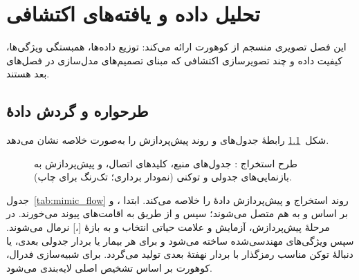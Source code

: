\chapter{تحلیل داده و یافته‌های اکتشافی}
\label{ch:data_analysis}

این فصل تصویری منسجم از کوهورت  ارائه می‌کند: توزیع داده‌ها، همبستگی ویژگی‌ها، کیفیت داده و چند تصویرسازی اکتشافی که مبنای تصمیم‌های مدل‌سازی در فصل‌های بعد هستند.

\section{طرحواره و گردش دادۀ }

شکل~\ref{fig:mimic_schema} رابطۀ جدول‌های  و روند پیش‌پردازش را به‌صورت خلاصه نشان می‌دهد.

\begin{figure}[htbp]
\centering
\begin{latin}

\end{latin}
\caption{طرح استخراج : جدول‌های منبع، کلیدهای اتصال، و پیش‌پردازش به بازنمایی‌های جدولی و توکنی (نمودار برداری؛ تک‌رنگ برای چاپ).}
\label{fig:mimic_schema}
\end{figure}

جدول~\ref{tab:mimic_flow} روند استخراج و پیش‌پردازش دادۀ  را خلاصه می‌کند. ابتدا \texttt{}، \texttt{} و \texttt{} بر اساس \texttt{} و \texttt{} به هم متصل می‌شوند؛ سپس \texttt{} و \texttt{} از طریق \texttt{} به اقامت‌های  پیوند می‌خورند. در مرحلۀ پیش‌پردازش،  آزمایش و  علامت حیاتی انتخاب و به بازۀ [،] نرمال می‌شوند. سپس ویژگی‌های مهندسی‌شده ساخته می‌شود و برای هر بیمار یا بردار جدولی بعدی، یا دنبالۀ توکن مناسب رمزگذار  با بردار نهفتۀ بعدی تولید می‌گردد. برای شبیه‌سازی فدرال، کوهورت بر اساس تشخیص اصلی  لایه‌بندی می‌شود.

